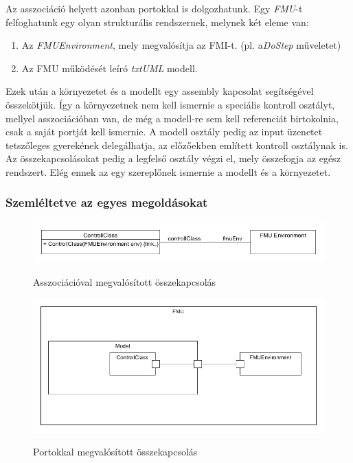 \documentclass[a4paper,12pt]{report}
\begin{document}
Az asszociáció helyett azonban portokkal is dolgozhatunk. Egy \textit{FMU}-t felfoghatunk egy olyan strukturális rendszernek, melynek két eleme van:
\begin{enumerate}
\item Az \textit{FMUEnvironment}, mely megvalósítja az FMI-t. (pl. a\textit{DoStep} műveletet)
\item Az FMU működését leíró \textit{txtUML} modell.
\end{enumerate}
Ezek után a környezetet és a modellt egy assembly kapcsolat segítségével összekötjük. Így a környezetnek nem kell ismernie a speciális kontroll osztályt, mellyel asszociációban van, de még a modell-re sem kell referenciát birtokolnia, csak a saját portját kell ismernie. A modell osztály pedig az input üzenetet tetszőleges gyerekének delegálhatja, az előzőekben említett kontroll osztálynak is. Az összekapcsolásokat pedig a legfelső osztály végzi el, mely összefogja az egész rendszert. Elég ennek az egy szereplőnek ismernie a modellt és a környezetet.  \\

\subsubsection{Szemléltetve az egyes megoldásokat}


\begin{figure}[H]
\begin{center}
\includegraphics[scale=0.6]{fmu_simple.png} \\
\end{center}
\caption{Asszociációval megvalósított összekapcsolás}
\end{figure}


\begin{figure}[H]
\begin{center}
\includegraphics[scale=0.6]{fmu_with_ports.png} \\
\end{center}
\caption{Portokkal megvalósított összekapcsolás}
\end{figure}
\end{document}
